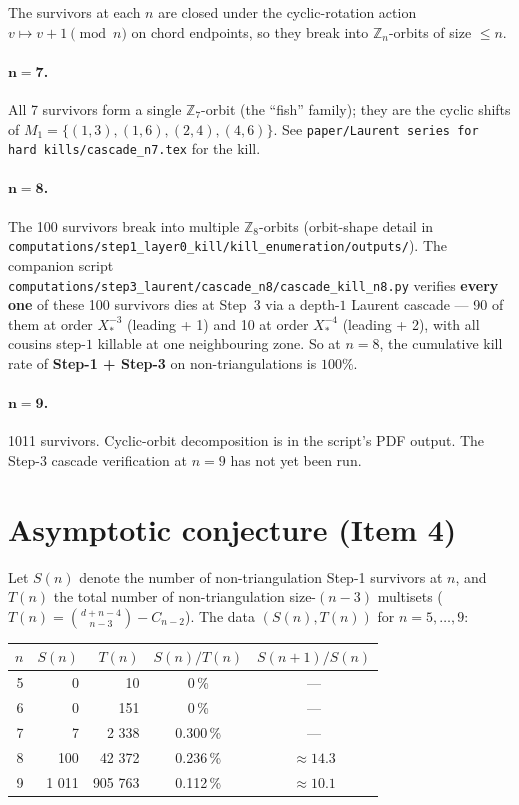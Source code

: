 \documentclass[11pt]{article}
\theoremstyle{definition}
\begin{document}
The survivors at each $n$ are closed under the cyclic-rotation action
$v \mapsto v + 1 \pmod{n}$ on chord endpoints, so they break into
$\mathbb Z_n$-orbits of size $\le n$.

\paragraph{$\boldsymbol{n=7}$.} All 7 survivors form a single
$\mathbb Z_7$-orbit (the ``fish'' family); they are the cyclic shifts of
$M_1 = \{(1,3), (1,6), (2,4), (4,6)\}$. See
\verb|paper/Laurent series for hard kills/cascade_n7.tex| for the kill.

\paragraph{$\boldsymbol{n=8}$.} The 100 survivors break into multiple
$\mathbb Z_8$-orbits (orbit-shape detail in
\verb|computations/step1_layer0_kill/kill_enumeration/outputs/|). The
companion script
\verb|computations/step3_laurent/cascade_n8/cascade_kill_n8.py| verifies
\textbf{every one} of these 100 survivors dies at Step~3 via a depth-$1$
Laurent cascade --- 90 of them at order $X_*^{-3}$ (leading + 1) and 10
at order $X_*^{-4}$ (leading + 2), with all cousins step-$1$ killable at
one neighbouring zone. So at $n=8$, the cumulative kill rate of
\textbf{Step-1 + Step-3} on non-triangulations is $100\%$.

\paragraph{$\boldsymbol{n=9}$.} 1011 survivors. Cyclic-orbit
decomposition is in the script's PDF output. The Step-3 cascade
verification at $n=9$ has not yet been run.

\section{Asymptotic conjecture (Item 4)}

Let $S(n)$ denote the number of non-triangulation Step-1 survivors at
$n$, and $T(n)$ the total number of non-triangulation size-$(n-3)$
multisets ($T(n) = \binom{d + n - 4}{n-3} - C_{n-2}$). The data
$(S(n), T(n))$ for $n = 5, \dots, 9$:

\begin{center}
\begin{tabular}{rrrcc}
\toprule
$n$ & $S(n)$ & $T(n)$ & $S(n)/T(n)$ & $S(n+1)/S(n)$ \\
\midrule
5 &     0 &      10 &  0\,\%       &   ---     \\
6 &     0 &     151 &  0\,\%       &   ---     \\
7 &     7 &   2 338 &  0.300\,\%   &   ---     \\
8 &   100 &  42 372 &  0.236\,\%   & $\approx 14.3$ \\
9 & 1 011 & 905 763 &  0.112\,\%   & $\approx 10.1$ \\
\bottomrule
\end{tabular}
\end{center}
\end{document}
